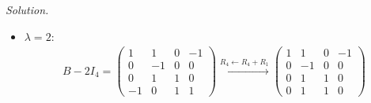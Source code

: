 \documentclass[12pt]{article}
\theoremstyle{definition}
\newenvironment{solution}{\par\noindent\textit{Solution.}\ }{\par\smallskip}
\begin{document}
\begin{solution}
\begin{itemize}
\[\begin{gathered}
\xrightarrow{R_1\leftarrow-R_1}
\begin{pmatrix}1&0&-1&-2\\0&0&0&0\\0&1&2&0\\2&1&0&-1\end{pmatrix}
\\
\xrightarrow{R_4\leftarrow R_4-2R_1}
\begin{pmatrix}1&0&-1&-2\\0&0&0&0\\0&1&2&0\\0&1&2&3\end{pmatrix}
\xrightarrow{R_2\leftrightarrow R_4}
\begin{pmatrix}1&0&-1&-2\\0&1&2&3\\0&1&2&0\\0&0&0&0\end{pmatrix}
\\
\xrightarrow{R_3\leftarrow R_3-R_2}
\begin{pmatrix}1&0&-1&-2\\0&1&2&3\\0&0&0&-3\\0&0&0&0\end{pmatrix}
\xrightarrow{R_3\leftarrow-\frac13R_3}
\begin{pmatrix}1&0&-1&-2\\0&1&2&3\\0&0&0&1\\0&0&0&0\end{pmatrix}
\\
\xrightarrow[R_2\leftarrow R_2-3R_3]{R_1\leftarrow R_1+2R_3}
\begin{pmatrix}1&0&-1&0\\0&1&2&0\\0&0&0&1\\0&0&0&0\end{pmatrix}
\end{gathered}
\]
The special solution \((1,-2,1,0)'\) is a basis of \(\mathcal N(B-I_4)\) (Theorem~\ref{thm:r4-four-bases}(c)).
\item \(\lambda=2\):
\[
\begin{gathered}
B-2I_4=\begin{pmatrix}1&1&0&-1\\0&-1&0&0\\0&1&1&0\\-1&0&1&1\end{pmatrix}
\xrightarrow{R_4\leftarrow R_4+R_1}
\begin{pmatrix}1&1&0&-1\\0&-1&0&0\\0&1&1&0\\0&1&1&0\end{pmatrix}

\end{gathered}\]
\end{itemize}
\end{solution}
\end{document}
